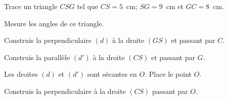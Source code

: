 \begin{myenumerate}
\item Trace un triangle $CSG$ tel que $CS=5$~cm; $SG=9$~cm et
$GC=8$~cm.
\item Mesure les angles de ce triangle.
\item Construis la perpendiculaire $(d)$ à la droite $(GS)$ et
passant par $C$.
\item Construis la parallèle $(d')$ à la droite $(CS)$ et passant par
$G$.
\item Les droites $(d)$ et $(d')$ sont sécantes en $O$. Place le
point $O$.
\item Construis la perpendiculaire à la droite $(CS)$ passant par
$O$.
\end{myenumerate}
